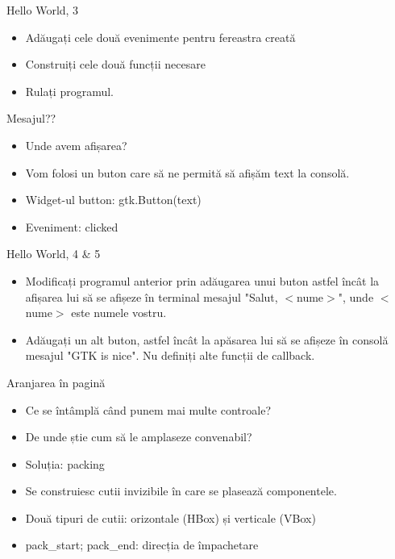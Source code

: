 \documentclass{beamer}
\begin{document}
\begin{frame}{Hello World, 3}
\begin{itemize}
	\item Adăugați cele două evenimente pentru fereastra creată
	\item Construiți cele două funcții necesare
	\item Rulați programul.
\end{itemize}
\end{frame}

\begin{frame}{Mesajul??}
\begin{itemize}
	\item Unde avem afișarea?
	\item Vom folosi un buton care să ne permită să afișăm text la consolă.
	\item Widget-ul button: gtk.Button(text)
	\item Eveniment: clicked
\end{itemize}
\end{frame}

\begin{frame}{Hello World, 4 \& 5}
\begin{itemize}
	\item Modificați programul anterior prin adăugarea unui buton astfel încât la afișarea lui să se afișeze în terminal mesajul "Salut, $<$nume$>$", unde $<$nume$>$ este numele vostru.
	\item \pause Adăugați un alt buton, astfel încât la apăsarea lui să se afișeze în consolă mesajul "GTK is nice". Nu definiți alte funcții de callback.
\end{itemize}
\end{frame}

\begin{frame}{Aranjarea în pagină}
\begin{itemize}
	\item Ce se întâmplă când punem mai multe controale?
	\item De unde știe cum să le amplaseze convenabil?
	\item \pause Soluția: packing
	\item \pause Se construiesc cutii invizibile în care se plasează componentele.
	\item \pause Două tipuri de cutii: orizontale (HBox) și verticale (VBox)
	\item \pause pack\_start; pack\_end: \pause direcția de împachetare
\end{itemize}
\end{frame}
\end{document}
